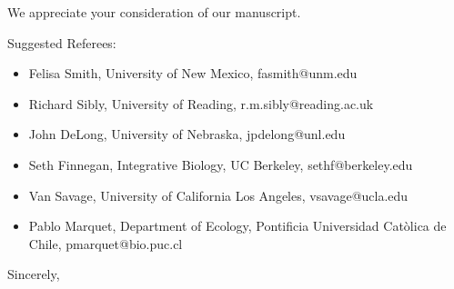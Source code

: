 \documentclass[ucm,12pt]{ucletter}
\begin{document}
\begin{letter}
We appreciate your consideration of our manuscript.

Suggested Referees:
\begin{itemize}
\item[] Felisa Smith, University of New Mexico, fasmith@unm.edu
\item[] Richard Sibly, University of Reading, r.m.sibly@reading.ac.uk
\item[] John DeLong, University of Nebraska, jpdelong@unl.edu
\item[] Seth Finnegan, Integrative Biology, UC Berkeley, sethf@berkeley.edu
\item[] Van Savage, University of California Los Angeles, vsavage@ucla.edu
\item[] Pablo Marquet, Department of Ecology, Pontificia Universidad Cat\`olica de Chile, pmarquet@bio.puc.cl
\end{itemize}

\vspace{5mm}

\singlespacing
\closing{Sincerely,\\
\\
}

\end{letter}
\end{document}
